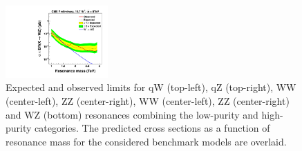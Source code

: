 \begin{figure}[h!tpb]
\begin{center}
\includegraphics[width=0.35\textwidth]{EXO-12-024/figs/limits/brazilianFlag_WZ_combined.pdf}
\end{center}
\caption{Expected and observed limits for qW (top-left), qZ (top-right), \GRS WW (center-left), \GRS ZZ (center-right), \GBulk WW (center-left), \GBulk ZZ (center-right) and WZ (bottom) resonances
 combining the low-purity and high-purity categories.
  The predicted cross sections as a function of resonance mass for the considered benchmark models are overlaid.}
\label{fig:Vtagresults3}
\end{figure}


